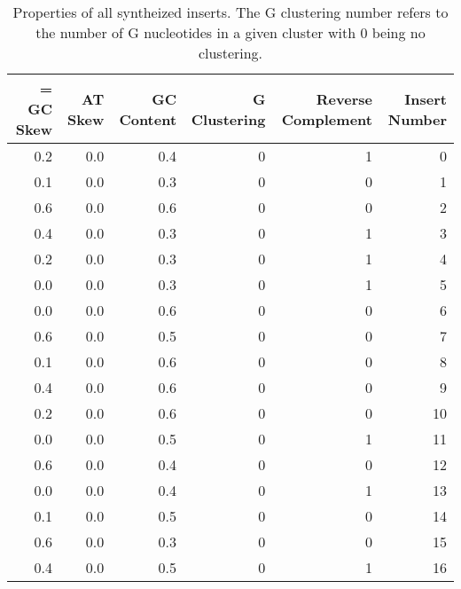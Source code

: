 \begin{table}
\centering
\caption{Properties of all syntheized inserts. The G clustering number refers to the number of G nucleotides in a given cluster with 0 being no clustering.}
\label{table:1}
\begin{tabular}{rrrrrr}
\toprule=
 GC Skew &  AT Skew &  GC Content &  G Clustering &  Reverse Complement &  Insert Number \\
\midrule
     0.2 &      0.0 &         0.4 &             0 &                   1 &              0 \\
     0.1 &      0.0 &         0.3 &             0 &                   0 &              1 \\
     0.6 &      0.0 &         0.6 &             0 &                   0 &              2 \\
     0.4 &      0.0 &         0.3 &             0 &                   1 &              3 \\
     0.2 &      0.0 &         0.3 &             0 &                   1 &              4 \\
     0.0 &      0.0 &         0.3 &             0 &                   1 &              5 \\
     0.0 &      0.0 &         0.6 &             0 &                   0 &              6 \\
     0.6 &      0.0 &         0.5 &             0 &                   0 &              7 \\
     0.1 &      0.0 &         0.6 &             0 &                   0 &              8 \\
     0.4 &      0.0 &         0.6 &             0 &                   0 &              9 \\
     0.2 &      0.0 &         0.6 &             0 &                   0 &             10 \\
     0.0 &      0.0 &         0.5 &             0 &                   1 &             11 \\
     0.6 &      0.0 &         0.4 &             0 &                   0 &             12 \\
     0.0 &      0.0 &         0.4 &             0 &                   1 &             13 \\
     0.1 &      0.0 &         0.5 &             0 &                   0 &             14 \\
     0.6 &      0.0 &         0.3 &             0 &                   0 &             15 \\
     0.4 &      0.0 &         0.5 &             0 &                   1 &             16 \\

\end{tabular}
\end{table}
